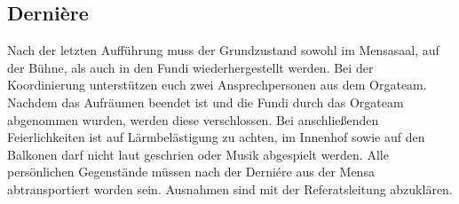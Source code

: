 \subsection{Dernière}
Nach der letzten Aufführung muss der Grundzustand sowohl im Mensasaal, auf der Bühne, als auch in den Fundi wiederhergestellt werden. Bei der Koordinierung unterstützen euch zwei Ansprechpersonen aus dem Orgateam. 	
Nachdem das Aufräumen beendet ist und die Fundi durch das Orgateam abgenommen wurden, werden diese verschlossen. Bei anschließenden Feierlichkeiten ist auf Lärmbelästigung zu achten, im Innenhof sowie auf den Balkonen darf nicht laut geschrien oder Musik abgespielt werden. 	
Alle persönlichen Gegenstände müssen nach der Derniére aus der Mensa abtransportiert worden sein. Ausnahmen sind mit der Referatsleitung abzuklären.
